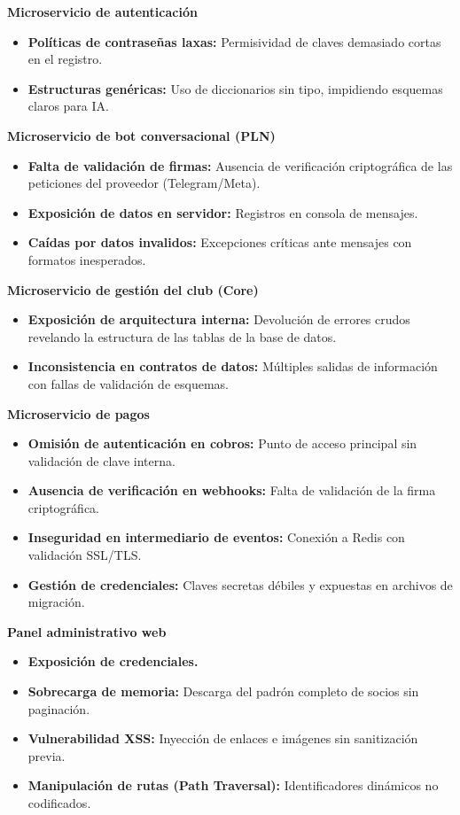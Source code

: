 \documentclass[conference, a4paper]{IEEEtran}
\begin{document}
\noindent \textbf{Microservicio de autenticaci\'on}
\begin{itemize}
    \item \textbf{Pol\'iticas de contrase\~nas laxas:} Permisividad de claves demasiado cortas en el registro.
    \item \textbf{Estructuras gen\'ericas:} Uso de diccionarios sin tipo, impidiendo esquemas claros para IA.
\end{itemize}

\noindent \textbf{Microservicio de bot conversacional (PLN)}
\begin{itemize}
    \item \textbf{Falta de validaci\'on de firmas:} Ausencia de verificaci\'on criptogr\'afica de las peticiones del proveedor (Telegram/Meta).
    \item \textbf{Exposici\'on de datos en servidor:} Registros en consola de mensajes.
    \item \textbf{Ca\'idas por datos invalidos:} Excepciones cr\'iticas ante mensajes con formatos inesperados.
\end{itemize}

\noindent \textbf{Microservicio de gesti\'on del club (Core)}
\begin{itemize}
    \item \textbf{Exposici\'on de arquitectura interna:} Devoluci\'on de errores crudos revelando la estructura de las tablas de la base de datos.
    \item \textbf{Inconsistencia en contratos de datos:} M\'ultiples salidas de informaci\'on con fallas de validaci\'on de esquemas.
\end{itemize}

\noindent \textbf{Microservicio de pagos}
\begin{itemize}
    \item \textbf{Omisi\'on de autenticaci\'on en cobros:} Punto de acceso principal sin validaci\'on de clave interna.
    \item \textbf{Ausencia de verificaci\'on en webhooks:} Falta de validaci\'on de la firma criptogr\'afica.
    \item \textbf{Inseguridad en intermediario de eventos:} Conexi\'on a Redis con validaci\'on SSL/TLS.
    \item \textbf{Gesti\'on de credenciales:} Claves secretas d\'ebiles y expuestas en archivos de migraci\'on.
\end{itemize}

\noindent \textbf{Panel administrativo web}
\begin{itemize}
    \item \textbf{Exposici\'on de credenciales.}
    \item \textbf{Sobrecarga de memoria:} Descarga del padr\'on completo de socios sin paginaci\'on.
    \item \textbf{Vulnerabilidad XSS:} Inyecci\'on de enlaces e im\'agenes sin sanitizaci\'on previa.
    \item \textbf{Manipulaci\'on de rutas (Path Traversal):} Identificadores din\'amicos no codificados.
\end{itemize}
\end{document}
